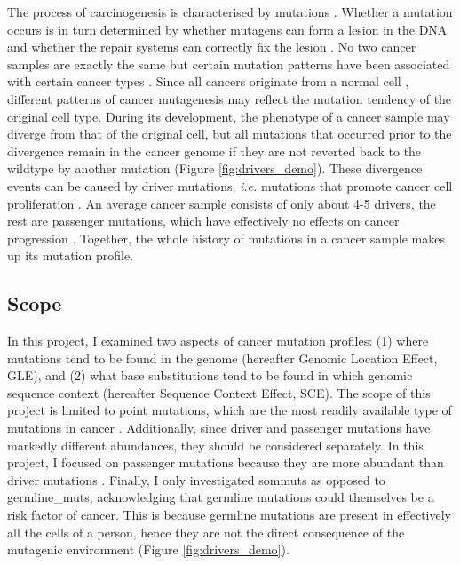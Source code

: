 The process of \gls{carcinogenesis} is characterised by mutations \citep{Stratton2009}. Whether a mutation occurs is in turn determined by whether mutagens can form a \gls{lesion} in the DNA and whether the repair systems can correctly fix the lesion \citep{Chatterjee2017MechanismsMutagenesis}. No two cancer samples are exactly the same but certain mutation patterns have been associated with certain cancer types \citep{Alexandrov2013,Polak2015,Campbell2020}. Since all cancers originate from a normal cell \citep{Hanahan2011HallmarksGeneration}, different patterns of cancer \gls{mutagenesis} may reflect the mutation tendency of the original cell type. During its development, the phenotype of a cancer sample may diverge from that of the original cell, but all mutations that occurred prior to the divergence remain in the cancer genome if they are not reverted back to the wildtype by another mutation (Figure \ref{fig:drivers_demo}). These divergence events can be caused by driver mutations, \textit{i.e.} mutations that promote cancer cell proliferation \citep{Pon2015}. An average cancer sample consists of only about 4-5 drivers, the rest are passenger mutations, which have effectively no effects on cancer progression \citep{Campbell2020}. Together, the whole history of mutations in a cancer sample makes up its mutation profile. 



\subsection{Scope}
In this project, I examined two aspects of cancer mutation profiles: (1) where mutations tend to be found in the genome (hereafter Genomic Location Effect, GLE), and (2) what base substitutions tend to be found in which genomic sequence context (hereafter Sequence Context Effect, SCE). The scope of this project is limited to point mutations, which are the most readily available type of mutations in cancer \citep{Alexandrov2020}. Additionally, since driver and passenger mutations have markedly different abundances, they should be considered separately. In this project, I focused on passenger mutations because they are more abundant than driver mutations \citep{McFarland2014Tug-of-warProcesses}. Finally, I only investigated \glspl{sommut} as opposed to \glspl{germline_mut}, acknowledging that germline mutations could themselves be a risk factor of cancer. This is because germline mutations are present in effectively all the cells of a person, hence they are not the direct consequence of the mutagenic environment (Figure \ref{fig:drivers_demo}).

